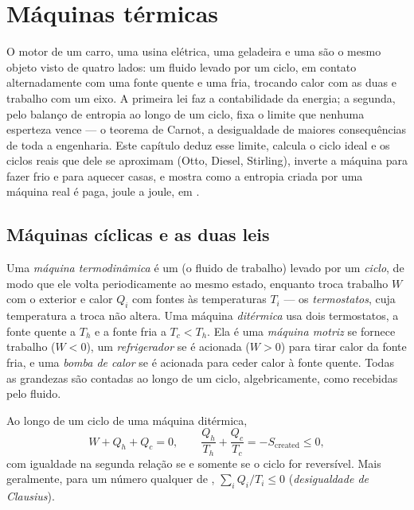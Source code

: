 \chapter{Máquinas térmicas}\label{ch:b1:heat-engines}

O motor de um carro, uma usina elétrica, uma geladeira e uma 
são o mesmo objeto visto de quatro lados: um fluido levado por um ciclo, em
contato alternadamente com uma fonte quente e uma fria, trocando calor com
as duas e trabalho com um eixo. A primeira lei faz a contabilidade da
energia; a segunda, pelo balanço de entropia ao longo de um ciclo, fixa o
limite que nenhuma esperteza vence --- o teorema de Carnot, a desigualdade
de maiores consequências de toda a engenharia. Este capítulo deduz esse
limite, calcula o ciclo ideal e os ciclos reais que dele se aproximam
(Otto, Diesel, Stirling), inverte a máquina para fazer frio e para aquecer
casas, e mostra como a entropia criada por uma máquina real é paga, joule a
joule, em .

\section{Máquinas cíclicas e as duas leis}

\begin{definition}\label{def:b1:heat-engines:machine}
Uma \emph{máquina termodinâmica} é um  (o fluido de
trabalho) levado por um \emph{ciclo}, de modo que ele volta
periodicamente ao mesmo estado, enquanto troca trabalho $W$ com o exterior
e calor $Q_i$ com fontes às temperaturas $T_i$ --- os \emph{termostatos},
cuja temperatura a troca não altera. Uma máquina \emph{ditérmica} usa dois
termostatos, a fonte quente a $T_h$ e a fonte fria a $T_c < T_h$.
Ela é uma \emph{máquina motriz} se fornece trabalho ($W < 0$), um
\emph{refrigerador} se é acionada ($W > 0$) para tirar calor da fonte
fria, e uma \emph{bomba de calor} se é acionada para ceder calor à fonte
quente. Todas as grandezas são contadas ao longo de um ciclo,
algebricamente, como recebidas pelo fluido.
\end{definition}

\begin{theorem}\label{thm:b1:heat-engines:clausius}
Ao longo de um ciclo de uma máquina ditérmica,
\[
W + Q_h + Q_c = 0 , \qquad
\frac{Q_h}{T_h} + \frac{Q_c}{T_c} = -S_{\mathrm{created}} \leq 0 ,
\]
com igualdade na segunda relação se e somente se o ciclo for
reversível. Mais geralmente, para um número qualquer de ,
$\sum_i Q_i/T_i \leq 0$ (\emph{desigualdade de Clausius}).
\end{theorem}

